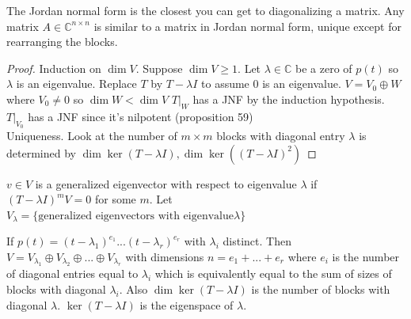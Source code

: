 \documentclass{article}
\newcommand{\C}{\mathbb{C}}
\begin{document}
The Jordan normal form is the closest you can get to diagonalizing a matrix. Any matrix $A\in \C^{n\times n}$ is similar to a matrix in Jordan normal form, unique except for rearranging the blocks.
\begin{proof}
Induction on $\dim V$. Suppose $\dim V\geq 1$. Let $\lambda\in \C$ be a zero of $p(t)$ so $\lambda$ is an eigenvalue. Replace $T$ by $T-\lambda I$ to assume $0$ is an eigenvalue. $V=V_0\oplus W$ where $V_0\neq 0$ so $\dim W<\dim V$ $T|_W$ has a JNF by the induction hypothesis. $T|_{V_0}$ has a JNF since it's nilpotent (proposition 59) \\
Uniqueness. Look at the number of $m\times m$ blocks with diagonal entry $\lambda$ is determined by $\dim\ker(T-\lambda I), \dim\ker((T-\lambda I)^2)$
\end{proof}
\begin{definition}
$v\in V$ is a generalized eigenvector with respect to eigenvalue $\lambda$ if $(T-\lambda I)^m V=0$ for some $m$. Let $V_\lambda =\{\textrm{generalized eigenvectors with eigenvalue}\lambda\}$
\end{definition}
\begin{corollary}
If $p(t)=(t-\lambda_1)^{e_1}...(t-\lambda_r)^{e_r}$ with $\lambda_i$ distinct. Then $V=V_{\lambda_1}\oplus V_{\lambda_2}\oplus...\oplus V_{\lambda_r}$ with dimensions $n=e_1+...+e_r$ where $e_i$ is the number of diagonal entries equal to $\lambda_i$ which is equivalently equal to the sum of sizes of blocks with diagonal $\lambda_i$. Also $\dim\ker(T-\lambda I)$ is the number of blocks with diagonal $\lambda$. $\ker(T-\lambda I)$ is the eigenspace of $\lambda$.
\end{corollary}
\end{document}
